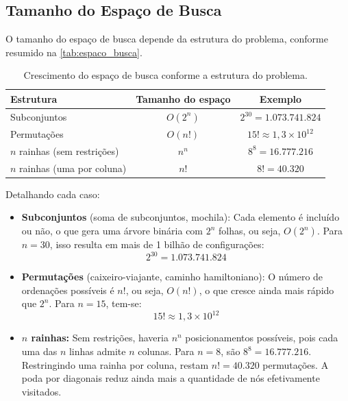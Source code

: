 \subsection{Tamanho do Espaço de Busca}

O tamanho do espaço de busca depende da estrutura do problema, conforme resumido na \autoref{tab:espaco_busca}.

\begin{table}[htb]
\centering
\caption{\label{tab:espaco_busca}Crescimento do espaço de busca conforme a estrutura do problema.}
\renewcommand{\arraystretch}{1.2}
\begin{tabular}{|l|c|c|}
\hline
\rowcolor{gray!20}
\textbf{Estrutura} & \textbf{Tamanho do espaço} & \textbf{Exemplo} \\ \hline
Subconjuntos & $O(2^n)$ & $2^{30} = 1.073.741.824$ \\ \hline
Permutações & $O(n!)$ & $15! \approx 1{,}3 \times 10^{12}$ \\ \hline
$n$ rainhas (sem restrições) & $n^n$ & $8^8 = 16.777.216$ \\ \hline
$n$ rainhas (uma por coluna) & $n!$ & $8! = 40.320$ \\ \hline
\end{tabular}
\end{table}

Detalhando cada caso:

\begin{itemize}
    \item \textbf{Subconjuntos} (soma de subconjuntos, mochila): Cada elemento é incluído ou não, o que gera uma árvore binária com $2^n$ folhas, ou seja, $O(2^n)$. Para $n = 30$, isso resulta em mais de 1 bilhão de configurações:
    \begin{equation}
        2^{30} = 1.073.741.824
    \end{equation}
    \item \textbf{Permutações} (caixeiro-viajante, caminho hamiltoniano): O número de ordenações possíveis é $n!$, ou seja, $O(n!)$, o que cresce ainda mais rápido que $2^n$. Para $n = 15$, tem-se:
    \begin{equation}
        15! \approx 1{,}3 \times 10^{12}
    \end{equation}
    \item \textbf{$n$ rainhas:} Sem restrições, haveria $n^n$ posicionamentos possíveis, pois cada uma das $n$ linhas admite $n$ colunas. Para $n = 8$, são $8^8 = 16.777.216$. Restringindo uma rainha por coluna, restam $n! = 40.320$ permutações. A poda por diagonais reduz ainda mais a quantidade de nós efetivamente visitados.
\end{itemize}

